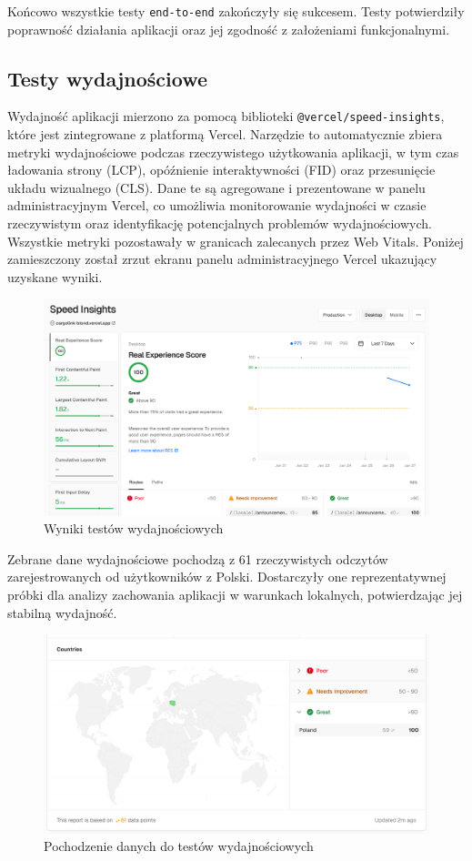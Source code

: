 Końcowo wszystkie testy \texttt{end-to-end} zakończyły się sukcesem. Testy potwierdziły poprawność działania aplikacji oraz jej zgodność z założeniami funkcjonalnymi.

\subsection{Testy wydajnościowe}

Wydajność aplikacji mierzono za pomocą biblioteki \texttt{@vercel/speed-insights}, które jest zintegrowane z platformą Vercel. Narzędzie to automatycznie zbiera metryki wydajnościowe podczas rzeczywistego użytkowania aplikacji, w tym czas ładowania strony (LCP), opóźnienie interaktywności (FID) oraz przesunięcie układu wizualnego (CLS). Dane te są agregowane i prezentowane w panelu administracyjnym Vercel, co umożliwia monitorowanie wydajności w czasie rzeczywistym oraz identyfikację potencjalnych problemów wydajnościowych. Wszystkie metryki pozostawały w granicach zalecanych przez Web Vitals. Poniżej zamieszczony został zrzut ekranu panelu administracyjnego Vercel ukazujący uzyskane wyniki.

\begin{figure}[H]
  \centering
    \includegraphics[width=1\linewidth]{rozdzial2/testy_wydajnosciowe_wyniki.png}
  \caption{Wyniki testów wydajnościowych}
\end{figure}

\pagebreak
Zebrane dane wydajnościowe pochodzą z 61 rzeczywistych odczytów zarejestrowanych od użytkowników z Polski. Dostarczyły one reprezentatywnej próbki dla analizy zachowania aplikacji w warunkach lokalnych, potwierdzając jej stabilną wydajność.

\begin{figure}[H]
  \centering
    \includegraphics[width=1\linewidth]{rozdzial2/probka_statystyczna.png}
  \caption{Pochodzenie danych do testów wydajnościowych}
\end{figure}